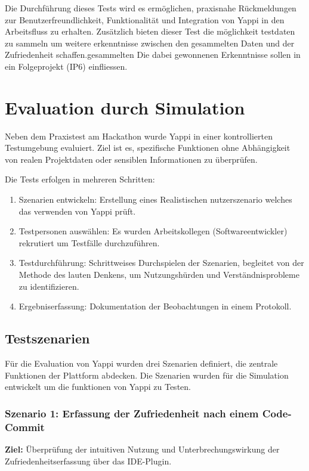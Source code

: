 \documentclass[12pt,a4paper]{report}
\begin{document}
 Die Durchführung dieses Tests wird es ermöglichen, praxisnahe Rückmeldungen zur Benutzerfreundlichkeit, Funktionalität
 und Integration von Yappi in den Arbeitsfluss zu erhalten. Zusätzlich bieten dieser Test die möglichkeit testdaten zu
 sammeln um weitere erkenntnisse zwischen den gesammelten Daten und der Zufriedenheit schaffen.gesammelten Die dabei
 gewonnenen Erkenntnisse sollen in ein Folgeprojekt (IP6) einfliessen.

\section{Evaluation durch Simulation}

    Neben dem Praxistest am Hackathon wurde Yappi in einer kontrollierten Testumgebung evaluiert. Ziel ist es, spezifische
    Funktionen ohne Abhängigkeit von realen Projektdaten oder sensiblen Informationen zu überprüfen.

    Die Tests erfolgen in mehreren Schritten:
    \begin{enumerate}
        \item Szenarien entwickeln: Erstellung eines Realistischen nutzerszenario welches das verwenden von Yappi prüft.
        \item Testpersonen auswählen: Es wurden Arbeitskollegen (Softwareentwickler) rekrutiert um Testfälle durchzuführen.
        \item Testdurchführung: Schrittweises Durchspielen der Szenarien, begleitet von der Methode des lauten Denkens,
        um Nutzungshürden und Verständnisprobleme zu identifizieren.
        \item Ergebniserfassung: Dokumentation der Beobachtungen in einem Protokoll.
    \end{enumerate}


    \subsection{Testszenarien}

    Für die Evaluation von Yappi wurden drei Szenarien definiert, die zentrale Funktionen der Plattform abdecken.
    Die Szenarien wurden für die Simulation entwickelt um die funktionen von Yappi zu Testen.

    \subsubsection{Szenario 1: Erfassung der Zufriedenheit nach einem Code-Commit}
    \textbf{Ziel:} Überprüfung der intuitiven Nutzung und Unterbrechungswirkung der Zufriedenheitserfassung über das IDE-Plugin.
\end{document}
